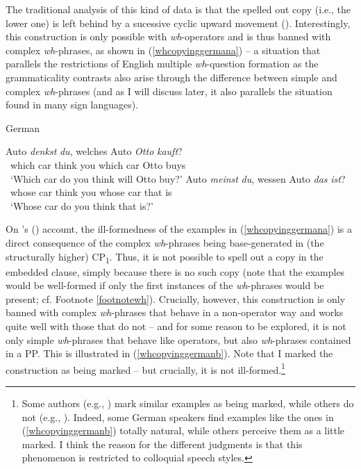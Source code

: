 \noindent The traditional analysis of this kind of data is that the spelled out copy (i.e., the lower one) is left behind by a sucessive cyclic upward movement (\citealt{mcdaniel1986conditions, fanselow2000towards, hohle2000w, nunes2004linearization, schippers2012some, pankau2013replacing, bayer1984comp, bayer2014}). Interestingly, this construction is only possible with \textit{wh}-operators and is thus banned with complex \textit{wh}-phrases, as shown in (\ref{whcopyinggermana}) -- a situation that parallels the restrictions of English multiple \textit{wh}-question formation as the grammaticality contrasts also arise through the difference between simple and complex \textit{wh}-phrases (and as I will discuss later, it also parallels the situation found in many sign languages).

\newpage 



\begin{exe}
\ex German \label{whcopyinggermana} \begin{xlist}
\ex {} {Auto} {\textit{denkst}} {\textit{du},} {welches} {Auto} {\textit{Otto}} {\textit{kauft}?}   \\
{\textcolor{white}{*}which} {car} {think} {you} {which} {car} {Otto}  {buys}\\
\trans \textcolor{white}{*}`Which car do you think will Otto buy?' \label{ex:whcopyinggermanaa}\ex {}  {Auto}  {\textit{meinst}}  {\textit{du},}  {wessen}  {Auto}  {\textit{das}}  {\textit{ist}?} \\
{\textcolor{white}{*}whose} {car} {think} {you} {whose} {car} {that} {is} \\
\trans \textcolor{white}{*}`Whose car do you think that is?' \label{ex:whcopyinggermanab}
\end{xlist}
\end{exe}

\noindent On \citeauthor{van2010complex}'s (\citeyear{van2010complex, van2012you}) account, the ill-formedness of the examples in (\ref{whcopyinggermana}) is a direct consequence of the complex \textit{wh}-phrases being base-generated in (the structurally higher) CP\textsubscript{1}. Thus, it is not possible to spell out a copy in the embedded clause, simply because there is no such copy (note that the examples would be well-formed if only the first instances of the \textit{wh}-phrases would be present; cf. Footnote \ref{footnotewh}). Crucially, however, this construction is only banned with complex \textit{wh}-phrases that behave in a non-operator way and works quite well with those that do not -- and for some reason to be explored, it is not only simple \textit{wh}-phrases that behave like operators, but also \textit{wh}-phrases contained in a PP. This is illustrated in (\ref{whcopyinggermanb}). Note that I marked the construction as being marked -- but crucially, it is not ill-formed.\footnote{Some authors (e.g., \citealt{felser2004wh}) mark similar examples as being marked, while others do not (e.g., \citealt{van2010complex}). Indeed, some German speakers find examples like the ones in (\ref{whcopyinggermanb}) totally natural, while others perceive them as a little marked. I think the reason for the different judgments is that this phenomenon is restricted to colloquial speech styles.}


